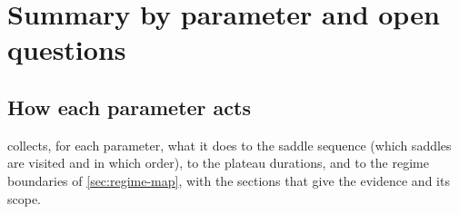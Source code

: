 \section{Summary by parameter and open questions}\label{sec:summary}

\subsection{How each parameter acts}\label{sec:summary-parameters}

 collects, for each parameter, what it does to the saddle sequence (which
saddles are visited and in which order), to the plateau durations, and to the regime boundaries of
\cref{sec:regime-map}, with the sections that give the evidence and its scope.

